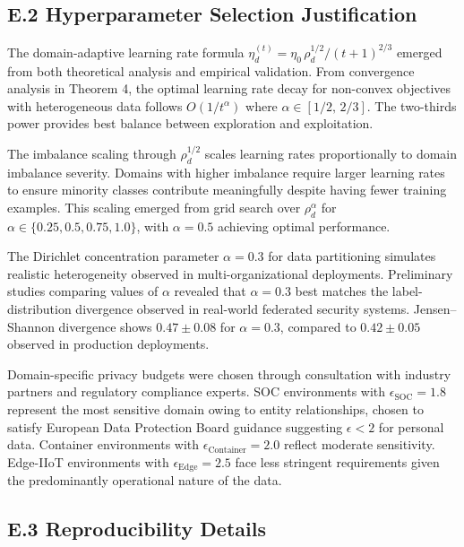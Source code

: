\documentclass[12pt,a4paper]{article}
\theoremstyle{definition}
\begin{document}
\subsection{E.2 Hyperparameter Selection Justification}

\begingroup
\setlength{\emergencystretch}{2em}

The domain-adaptive learning rate formula \(\eta_d^{(t)}=\eta_0\,\rho_d^{1/2}/(t+1)^{2/3}\) emerged from both theoretical analysis and empirical validation. From convergence analysis in Theorem 4, the optimal learning rate decay for non-convex objectives with heterogeneous data follows $O(1/t^{\alpha})$ where $\alpha \in [1/2,\, 2/3]$. The two-thirds power provides best balance between exploration and exploitation.

The imbalance scaling through \(\rho_d^{1/2}\) scales learning rates proportionally to domain imbalance severity. Domains with higher imbalance require larger learning rates to ensure minority classes contribute meaningfully despite having fewer training examples. This scaling emerged from grid search over \(\rho_d^{\alpha}\) for \(\alpha \in \{0.25,0.5,0.75,1.0\}\), with \(\alpha = 0.5\) achieving optimal performance.

\par\endgroup


The Dirichlet concentration parameter $\alpha = 0.3$ for data partitioning simulates realistic heterogeneity observed in multi-organizational deployments. Preliminary studies comparing values of $\alpha$ revealed that $\alpha = 0.3$ best matches the label-distribution divergence observed in real-world federated security systems. Jensen--Shannon divergence shows $0.47 \pm 0.08$ for $\alpha = 0.3$, compared to $0.42 \pm 0.05$ observed in production deployments.

Domain-specific privacy budgets were chosen through consultation with industry partners and regulatory compliance experts. SOC environments with $\epsilon_{\text{SOC}} = 1.8$ represent the most sensitive domain owing to entity relationships, chosen to satisfy European Data Protection Board guidance suggesting $\epsilon < 2$ for personal data. Container environments with $\epsilon_{\text{Container}} = 2.0$ reflect moderate sensitivity. Edge-IIoT environments with $\epsilon_{\text{Edge}} = 2.5$ face less stringent requirements given the predominantly operational nature of the data.

\subsection{E.3 Reproducibility Details}
\end{document}
